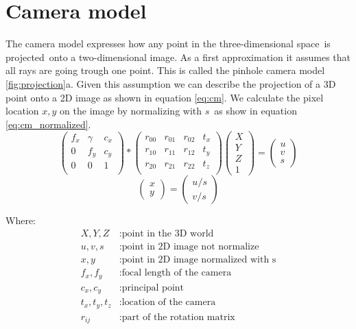 \documentclass[11pt,a4paper,titlepage,oneside]{report}
\begin{document}
\section{Camera model}
The camera model expresses how any point in the three-dimensional space is projected onto a two-dimensional image. As a first approximation it assumes that all rays are going trough one point. This is called the pinhole camera model \ref{fig:projection}a. Given this assumption we can describe the projection of a 3D point onto a 2D image as shown in equation \ref{eq:cm}. We calculate the pixel location $x,y$ on the image by normalizing with $s$ as show in equation \ref{eq:cm_normalized}.
\begin{equation}\label{eq:cm}
  \begin{pmatrix}
		f_x & \gamma & c_x \\
		0 & f_y & c_y \\
		0 & 0 & 1 \\
	\end{pmatrix}*
	\begin{pmatrix}
		r_{00} & r_{01} & r_{02} & t_x \\
		r_{10} & r_{11} & r_{12} & t_y \\
		r_{20} & r_{21} & r_{22} & t_z \\
	\end{pmatrix}
	\begin{pmatrix}
		X \\
		Y \\
		Z \\
		1
	\end{pmatrix}=
	\begin{pmatrix}
		u \\
		v \\
		s
  \end{pmatrix}
\end{equation}
\begin{equation}\label{eq:cm_normalized}
	\begin{pmatrix}
		x \\
		y
	\end{pmatrix}=
	\begin{pmatrix}
		u/s \\
		v/s 
  \end{pmatrix}
\end{equation}

Where:
\begin{align*}
  X,Y,Z			&: \text{point in the 3D world}\\
	u,v,s	   	&: \text{point in 2D image not normalize}\\
	x,y				&: \text{point in 2D image normalized with s}\\
	f_x,f_y  	&: \text{focal length of the camera}\\
  c_x,c_y  	&: \text{principal point}\\
  t_x,t_y,t_z	&: \text{location of the camera}\\
  r_{ij}	&: \text{part of the rotation matrix}
\end{align*}
\end{document}
